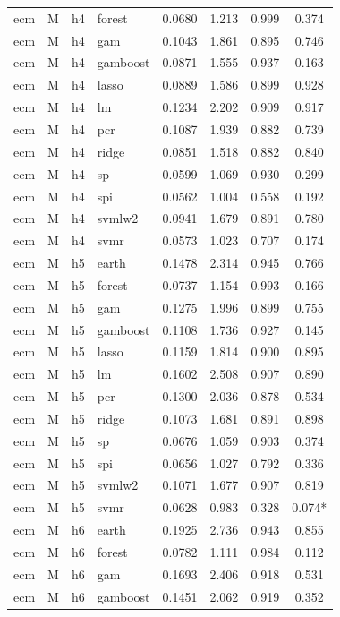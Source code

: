 \begin{ThreePartTable}
\begin{longtable}[t]{llclcccc}
ecm & M & h4 & forest & 0.0680 & 1.213 & 0.999 & 0.374\\
ecm & M & h4 & gam & 0.1043 & 1.861 & 0.895 & 0.746\\
ecm & M & h4 & gamboost & 0.0871 & 1.555 & 0.937 & 0.163\\
ecm & M & h4 & lasso & 0.0889 & 1.586 & 0.899 & 0.928\\
ecm & M & h4 & lm & 0.1234 & 2.202 & 0.909 & 0.917\\
ecm & M & h4 & pcr & 0.1087 & 1.939 & 0.882 & 0.739\\
ecm & M & h4 & ridge & 0.0851 & 1.518 & 0.882 & 0.840\\
ecm & M & h4 & sp & 0.0599 & 1.069 & 0.930 & 0.299\\
ecm & M & h4 & spi & 0.0562 & 1.004 & 0.558 & 0.192\\
ecm & M & h4 & svmlw2 & 0.0941 & 1.679 & 0.891 & 0.780\\
ecm & M & h4 & svmr & 0.0573 & 1.023 & 0.707 & 0.174\\
\addlinespace
ecm & M & h5 & earth & 0.1478 & 2.314 & 0.945 & 0.766\\
ecm & M & h5 & forest & 0.0737 & 1.154 & 0.993 & 0.166\\
ecm & M & h5 & gam & 0.1275 & 1.996 & 0.899 & 0.755\\
ecm & M & h5 & gamboost & 0.1108 & 1.736 & 0.927 & 0.145\\
ecm & M & h5 & lasso & 0.1159 & 1.814 & 0.900 & 0.895\\
ecm & M & h5 & lm & 0.1602 & 2.508 & 0.907 & 0.890\\
ecm & M & h5 & pcr & 0.1300 & 2.036 & 0.878 & 0.534\\
ecm & M & h5 & ridge & 0.1073 & 1.681 & 0.891 & 0.898\\
ecm & M & h5 & sp & 0.0676 & 1.059 & 0.903 & 0.374\\
ecm & M & h5 & spi & 0.0656 & 1.027 & 0.792 & 0.336\\
ecm & M & h5 & svmlw2 & 0.1071 & 1.677 & 0.907 & 0.819\\
ecm & M & h5 & svmr & 0.0628 & 0.983 & 0.328 & 0.074*\\
\addlinespace
ecm & M & h6 & earth & 0.1925 & 2.736 & 0.943 & 0.855\\
ecm & M & h6 & forest & 0.0782 & 1.111 & 0.984 & 0.112\\
ecm & M & h6 & gam & 0.1693 & 2.406 & 0.918 & 0.531\\
ecm & M & h6 & gamboost & 0.1451 & 2.062 & 0.919 & 0.352\\

\end{longtable}
\end{ThreePartTable}
